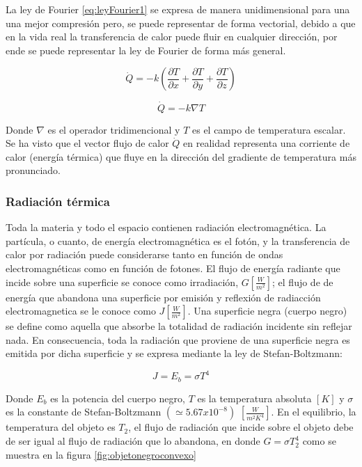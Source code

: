 \documentclass[12pt,letterpaper]{article}     %
\begin{document}
La ley de Fourier \ref{eq:leyFourier1} se expresa de manera unidimensional para una una mejor compresión pero, se puede representar de forma vectorial, debido a que en la vida real la transferencia de calor puede fluir en cualquier dirección, por ende se puede representar la ley de Fourier de forma más general.

\begin{equation}
\dot{Q} = -k(\frac{\partial T}{\partial x} + \frac{\partial T}{\partial y} + \frac{\partial T}{\partial z})   
    \label{eq:Fouriervectorialmente}
\end{equation}

\begin{equation}
\dot{Q} = -k\nabla T   
    \label{eq:Fouriernabla}
\end{equation}

\cite[p\ 1-2]{Warren} Donde $\nabla$ es el operador tridimencional y $T$ es el campo de temperatura escalar. Se ha visto que el vector flujo de calor $\dot{Q}$ en realidad representa una corriente de calor (energía térmica) que fluye en la dirección del gradiente de temperatura más pronunciado.



\subsubsection{Radiación térmica}

\cite[p\ 13-14]{Mills} Toda la materia y todo el espacio contienen radiación electromagnética. La partícula, o cuanto, de energía electromagnética es el fotón, y la transferencia de calor por radiación puede considerarse tanto en función de ondas electromagnéticas como en función de fotones. El flujo de energía radiante que incide sobre una superficie se conoce como irradiación, $G [\frac{W}{m^2}]$;  el flujo de de energía que abandona una superficie por emisión y reflexión de radiacción electromagnetica se le conoce como $J [\frac{W}{m^2}]$. Una superficie negra (cuerpo negro) se define como aquella que absorbe la totalidad de radiación incidente sin reflejar nada. En consecuencia, toda la radiación que proviene de una superficie negra es emitida por dicha superficie y se expresa mediante la ley de Stefan-Boltzmann:

\begin{equation}
    J = E_{b} = \sigma T^4
     \label{eq:Boltzmann1}
\end{equation}
 
 Donde $E_{b}$ es la potencia del cuerpo negro, $T$ es la temperatura absoluta $[K]$ y $\sigma$ es la constante de Stefan-Boltzmann $(\simeq 5.67x10^{-8})$ $[\frac{W}{m^2 K^4}]$. En el equilibrio, la temperatura del objeto es $T_{2}$, el flujo de radiación que incide sobre el objeto debe de ser igual al flujo de radiación que lo abandona, en donde $ G = \sigma T_{2}^{4}$ como se muestra en la figura \ref{fig:objetonegroconvexo}
 
\end{document}
